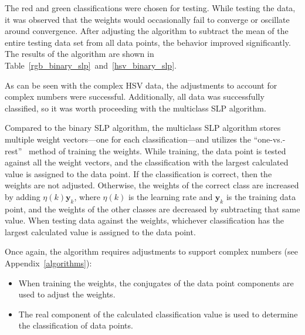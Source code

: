 \documentclass[twoside]{IEEEtran}
\begin{document}
The red and green classifications were chosen for testing. While testing the data, it was observed
that the weights would occasionally fail to converge or oscillate around convergence. After
adjusting the algorithm to subtract the mean of the entire testing data set from all data points, the
behavior improved significantly. The results of the algorithm are shown in Table~\ref{rgb_binary_slp}~and~\ref{hsv_binary_slp}.

As can be seen with the complex HSV data, the adjustments to account for complex numbers
were successful. Additionally, all data was successfully classified, so it was worth proceeding with
the multiclass SLP algorithm.

Compared to the binary SLP algorithm, the multiclass SLP algorithm stores multiple weight vectors---one
for each classification---and utilizes the ``one-vs.-rest''~\cite{bishop} method of training the
weights. While training, the data point is tested against all the weight vectors, and the
classification with the largest calculated value is assigned to the data point. If the classification is
correct, then the weights are not adjusted. Otherwise, the weights of the correct class are
increased by adding \( \eta\left(k\right)\mathbf{y}_k \), where \( \eta\left(k\right) \) is the learning
rate and \( \mathbf{y}_k \) is the training data point, and the weights of the other classes are decreased
by subtracting that same value. When testing data against the weights, whichever classification has the
largest calculated value is assigned to the data point.

Once again, the algorithm requires adjustments to support complex numbers (see Appendix~\ref{algorithms}):
\begin{itemize}
    \item When training the weights, the conjugates of the data point components are used to adjust
          the weights.

    \item The real component of the calculated classification value is used to determine the
          classification of data points.
\end{itemize}
\end{document}
